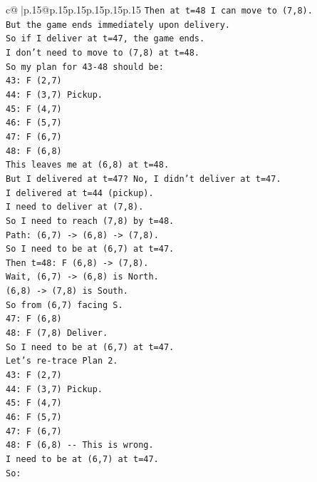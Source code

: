 \documentclass{article}
\begin{document}
{\begin{supertabular}{c@{$\;$}|p{.15\linewidth}@{}p{.15\linewidth}p{.15\linewidth}p{.15\linewidth}p{.15\linewidth}p{.15\linewidth}}
{{{\texttt{Then at t=48 I can move to (7,8).} \\
\texttt{But the game ends immediately upon delivery.} \\
\texttt{So if I deliver at t=47, the game ends.} \\
\texttt{I don't need to move to (7,8) at t=48.} \\
\texttt{So my plan for 43{-}48 should be:} \\
\texttt{43: F (2,7)} \\
\texttt{44: F (3,7) Pickup.} \\
\texttt{45: F (4,7)} \\
\texttt{46: F (5,7)} \\
\texttt{47: F (6,7)} \\
\texttt{48: F (6,8)} \\
\texttt{This leaves me at (6,8) at t=48.} \\
\texttt{But I delivered at t=47? No, I didn't deliver at t=47.} \\
\texttt{I delivered at t=44 (pickup).} \\
\texttt{I need to deliver at (7,8).} \\
\texttt{So I need to reach (7,8) by t=48.} \\
\texttt{Path: (6,7) {-}> (6,8) {-}> (7,8).} \\
\texttt{So I need to be at (6,7) at t=47.} \\
\texttt{Then t=48: F (6,8) {-}> (7,8).} \\
\texttt{Wait, (6,7) {-}> (6,8) is North.} \\
\texttt{(6,8) {-}> (7,8) is South.} \\
\texttt{So from (6,7) facing S.} \\
\texttt{47: F (6,8)} \\
\texttt{48: F (7,8) Deliver.} \\
\texttt{So I need to be at (6,7) at t=47.} \\
\texttt{Let's re{-}trace Plan 2.} \\
\texttt{43: F (2,7)} \\
\texttt{44: F (3,7) Pickup.} \\
\texttt{45: F (4,7)} \\
\texttt{46: F (5,7)} \\
\texttt{47: F (6,7)} \\
\texttt{48: F (6,8) {-}{-} This is wrong.} \\
\texttt{I need to be at (6,7) at t=47.} \\
\texttt{So:} \\
}}}
\end{supertabular}}
\end{document}

